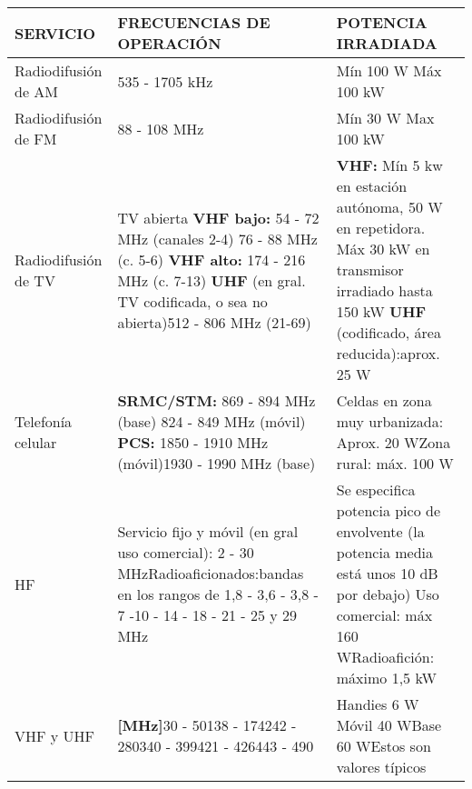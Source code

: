 \begin{table}[H]
\begin{tabular}{|l|L{6cm}|L{6cm}|}
\hline
SERVICIO            & FRECUENCIAS DE OPERACIÓN                                                                                                                                                           & POTENCIA IRRADIADA                                                                                                                                 \\
\hline
Radiodifusión de AM & 535 - 1705 kHz                                                                                                                                                                     & Mín 100 W Máx 100 kW                                                                                                                               
\\
\hline
Radiodifusión de FM & 88 - 108 MHz                                                                                                                                                                       & Mín 30 W Max 100 kW                                                                                                                                \\
\hline
Radiodifusión de TV & TV abierta \textbf{VHF bajo:} 54 - 72 MHz (canales 2-4) 76 - 88 MHz (c. 5-6) \textbf{VHF alto:} 174 - 216 MHz (c. 7-13) \textbf{UHF} (en gral. TV codificada, o sea no abierta)512 - 806 MHz (21-69) & \textbf{VHF:} Mín 5 kw en estación autónoma, 50 W en repetidora. Máx 30 kW en transmisor irradiado hasta 150 kW \textbf{UHF} (codificado, área reducida):aprox. 25 W \\
\hline
Telefonía celular   & \textbf{SRMC/STM:} 869 - 894 MHz (base) 824 - 849 MHz (móvil) \textbf{PCS:} 1850 - 1910 MHz (móvil)1930 - 1990 MHz (base)                                                                            & Celdas en zona muy urbanizada: Aprox. 20 WZona rural: máx. 100 W                                                                                   \\
\hline
HF                  & Servicio fijo y móvil (en gral uso comercial): 2 - 30 MHzRadioaficionados:bandas en los rangos de 1,8 - 3,6 - 3,8 - 7 -10 - 14 - 18 - 21 - 25 y 29 MHz                             & Se especifica potencia pico de envolvente (la potencia media está unos 10 dB por debajo) Uso comercial: máx 160 WRadioafición: máximo 1,5 kW       \\
\hline
VHF y UHF           & \textbf{{[}MHz{]}}30 - 50138 - 174242 - 280340 - 399421 - 426443 - 490                                                                                                                      & Handies 6 W Móvil 40 WBase 60 WEstos son valores típicos                                                                                           \\

\end{tabular}
\end{table}
